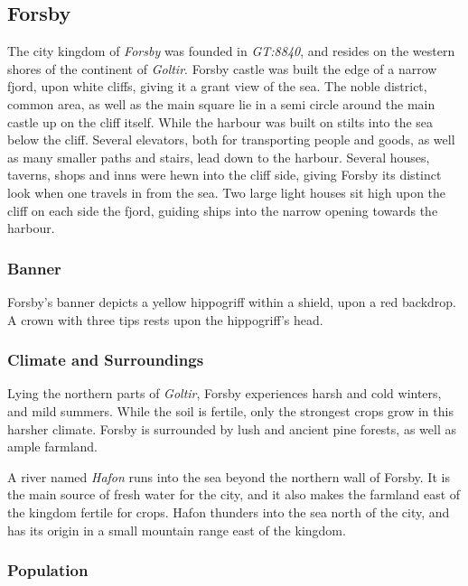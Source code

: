 \subsection{Forsby}


The city kingdom of \emph{Forsby} was founded in \emph{GT:8840}, and resides
on the western shores of the continent of \emph{Goltir}. Forsby castle was
built the edge of a narrow fjord, upon white cliffs, giving it a grant view of
the sea. The noble district, common area, as well as the main square lie in a
semi circle around the main castle up on the cliff itself. While the harbour
was built on stilts into the sea below the cliff. Several elevators, both for
transporting people and goods, as well as many smaller paths and stairs, lead
down to the harbour. Several houses, taverns, shops and inns were hewn into
the cliff side, giving Forsby its distinct look when one travels in from the
sea. Two large light houses sit high upon the cliff on each side the fjord,
guiding ships into the narrow opening towards the harbour.

\subsubsection*{Banner}

Forsby's banner depicts a yellow hippogriff within a shield, upon a red
backdrop. A crown with three tips rests upon the hippogriff's head.

\subsubsection*{Climate and Surroundings}

Lying the northern parts of \emph{Goltir}, Forsby experiences harsh and cold
winters, and mild summers. While the soil is fertile, only the strongest crops
grow in this harsher climate. Forsby is surrounded by lush and ancient pine
forests, as well as ample farmland.

A river named \emph{Hafon} runs into the sea beyond the northern wall of
Forsby. It is the main source of fresh water for the city, and it also makes
the farmland east of the kingdom fertile for crops. Hafon thunders into the
sea north of the city, and has its origin in a small mountain range east of
the kingdom.

\subsubsection*{Population}

